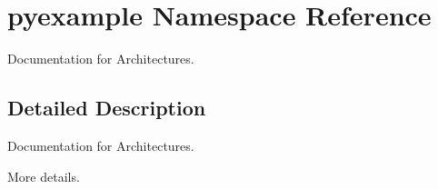 \hypertarget{namespacepyexample}{}\section{pyexample Namespace Reference}
\label{namespacepyexample}


Documentation for Architectures.  




\subsection{Detailed Description}
Documentation for Architectures. 

More details. 